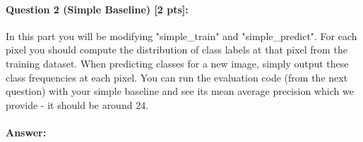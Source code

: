 \documentclass[9pt]{article}
\begin{document}
\begin{quote}
\end{quote}

\paragraph{Question 2 (Simple Baseline) [2 pts]:} 
In this part you will be modifying "simple\_train" and "simple\_predict". For each pixel you should compute the distribution of class labels at that pixel from the training dataset. When predicting classes for a new image, simply output these class frequencies at each pixel. You can run the evaluation code (from the next question) with your simple baseline and see its mean average precision which we provide - it should be around 24.
\paragraph{Answer:} 
\end{document}
